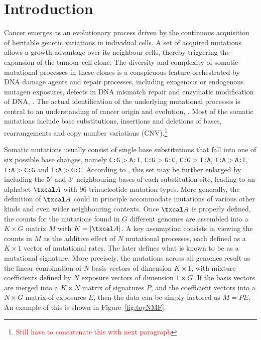 \documentclass{bioinfo}
\begin{document}
\section{Introduction}
Cancer emerges as an evolutionary process driven by the continuous
acquisition of heritable genetic variations in individual cells. A set
of acquired mutations allows a growth advantage over its neighbour
cells, thereby triggering the expansion of the tumour
cell clone. The diversity and complexity of somatic mutational
processes in these clones is a conspicuous feature orchestrated by DNA
damage agents and repair processes, including exogenous or endogenous
mutagen exposures, defects in DNA mismatch repair and enzymatic
modification of DNA, \cite{RG}. The actual identification of the
underlying mutational processes is central to an understanding of
cancer origin and evolution, \citealp{RG, AS, HEN}. Most of the
somatic mutations include base substitutions, insertions and deletions
of bases, rearrangements and copy number variations
(CNV).\footnote{\textcolor{red}{Still have to concatenate this with
next paragraph}}


Somatic mutations usually consist of single base substitutions that
fall into one of six possible base changes, namely
\texttt{C:G}$>$\texttt{A:T}, \texttt{C:G}$>$\texttt{G:C},
\texttt{C:G}$>$\texttt{T:A}, \texttt{T:A}$>$\texttt{A:T},
\texttt{T:A}$>$\texttt{C:G} and \texttt{T:A}$>$\texttt{G:C}. According
to \cite{A}, this set may be further enlarged by including the $5'$
and $3'$ neighbouring bases of each substitution site, leading to an 
alphabet $\txcal A$ with 96 trinucleotide mutation types. More
generally, the definition of $\txcal A$ could in principle accommodate
mutations of various other kinds 
and even wider neighbouring contexts. Once $\txcal A$
is properly defined, the counts for the mutations found in $G$
different genomes are assembled into a $K\times G$ matrix $M$ with $K
= |\txcal A|$. A key assumption consists in viewing the counts in $M$
as the additive effect of $N$ mutational processes, each defined as a
$K\times 1$ vector of mutational rates. The later defines what
is known to be as a mutational signature. More precisely, the
mutations across all genomes result as the linear combination of $N$
basis vectors of dimension $K\times 1$, with mixture coefficients
defined by $N$ exposure vectors of dimension $1 \times G$. If the
basis vectors are merged into a $K\times N$ matrix of signatures $P$,
and the coefficient vectors into a $N\times G$ matrix of exposures
$E$, then the data can be simply factored as $M=PE$. An example of
this is shown in Figure~\ref{fig:toyNMF}. 
\end{document}
